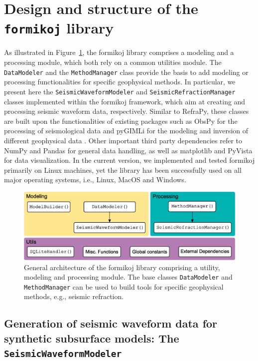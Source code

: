 \documentclass[a4paper,fleqn]{cas-sc}
\begin{document}
\section{Design and structure of the \texttt{formikoj} library}

As illustrated in Figure~\ref{fig:scheme}, the formikoj library comprises a modeling and a processing module, which both rely on a common utilities module. The \texttt{DataModeler} and the \texttt{MethodManager} class provide the basis to add modeling or processing functionalities for specific geophysical methods. In particular, we present here the \texttt{SeismicWaveformModeler} and \texttt{SeismicRefractionManager} classes implemented within the formikoj framework, which aim at creating and processing seismic waveform data, respectively. Similar to RefraPy, these classes are built upon the functionalities of existing packages such as ObsPy for the processing of seismological data \citep[][]{beyreuther2010} and pyGIMLi for the modeling and inversion of different geophysical data \citep{ruecker2017}. Other important third party dependencies refer to NumPy \citep{harris2020} and Pandas \citep{mckinney2010} for general data handling, as well as matplotlib \citep{hunter2007} and PyVista \citep{sullivan2019} for data visualization. In the current version, we implemented and tested formikoj primarily on Linux machines, yet the library has been successfully used on all major operating systems, i.e., Linux, MacOS and Windows.

\begin{figure}
	\centering
	\includegraphics[width=.75\textwidth]{figures/package_structure}
	\caption{General architecture of the formikoj library comprising a utility, modeling and processing module. The base classes \texttt{DataModeler} and \texttt{MethodManager} can be used to build tools for specific geophysical methods, e.g., seismic refraction.}
	\label{fig:scheme}
\end{figure}

\subsection{Generation of seismic waveform data for synthetic subsurface models: The \texttt{SeismicWaveformModeler}}
\end{document}
